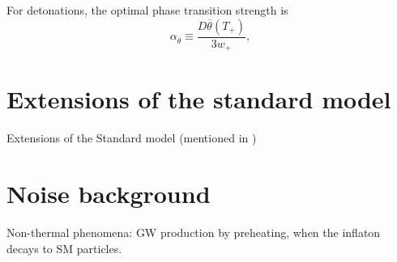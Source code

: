For detonations, the optimal phase transition strength is
\cites[eq. 34]{giese_2020}[eq. 1]{giese_2021}
\begin{equation}
\alpha_{\overline{\theta}} \equiv \frac{D \overline{\theta}(T_+)}{3w_+},
\end{equation}


\section{Extensions of the standard model}
Extensions of the Standard model \cite{caprini_detecting_2020}
(mentioned in \cite[p. 14]{lecture_notes})

\section{Noise background}
Non-thermal phenomena: GW production by preheating, when the inflaton decays to SM particles.
\cite{lecture_notes}
